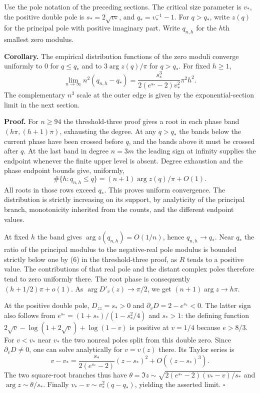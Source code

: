 \documentclass[11pt]{article}
\begin{document}
Use the pole notation of the preceding sections. The critical size parameter is $v_*$, the positive double pole is $s_*=2\sqrt{v_*}$, and $q_*=v_*^{-1}-1$. For $q>q_*$, write $z(q)$ for the principal pole with positive imaginary part. Write $q_{n,h}$ for the $h$th smallest zero modulus.

\textbf{Corollary.} The empirical distribution functions of the zero moduli converge uniformly to $0$ for $q\le q_*$ and to $3\arg z(q)/\pi$ for $q>q_*$. For fixed $h\ge1$,
\[
\lim_{n\to\infty} n^2(q_{n,h}-q_*)
 =\frac{s_*^3}{2(e^{s_*}-2)v_*^2}\pi^2 h^2 .
\]
The complementary $n^3$ scale at the outer edge is given by the exponential-section limit in the next section.

\textbf{Proof.} For $n\ge94$ the threshold-three proof gives a root in each phase band $(h\pi,(h+1)\pi)$, exhausting the degree. At any $q>q_*$ the bands below the current phase have been crossed before $q$, and the bands above it must be crossed after $q$. At the last band in degree $n=3m$ the leading sign at infinity supplies the endpoint whenever the finite upper level is absent. Degree exhaustion and the phase endpoint bounds give, uniformly,
\[
\#\{h:q_{n,h}\le q\}=(n+1)\arg z(q)/\pi+O(1).
\]
All roots in those rows exceed $q_*$. This proves uniform convergence. The distribution is strictly increasing on its support, by analyticity of the principal branch, monotonicity inherited from the counts, and the different endpoint values.

At fixed $h$ the band gives $\arg z(q_{n,h})=O(1/n)$, hence $q_{n,h}\to q_*$. Near $q_*$ the ratio of the principal modulus to the negative-real pole modulus is bounded strictly below one by (6) in the threshold-three proof, as $R$ tends to a positive value. The contributions of that real pole and the distant complex poles therefore tend to zero uniformly there. The root phase is consequently $(h+1/2)\pi+o(1)$. As $\arg D'_v(z)\to\pi/2$, we get $(n+1)\arg z\to h\pi$.

At the positive double pole, $D_{zz}=s_*>0$ and $\partial_v D=2-e^{s_*}<0$. The latter sign also follows from $e^{s_*}=(1+s_*)/(1-s_*^2/4)$ and $s_*>1$: the defining function $2\sqrt v-\log(1+2\sqrt v)+\log(1-v)$ is positive at $v=1/4$ because $e>8/3$. For $v<v_*$ near $v_*$ the two nonreal poles split from this double zero. Since $\partial_vD\ne0$, one can solve analytically for $v=v(z)$ there. Its Taylor series is
\[
v-v_* = \frac{s_*}{2(e^{s_*}-2)}(z-s_*)^2+O((z-s_*)^3).
\]
The two square-root branches thus have $\theta=\Im z\sim\sqrt{2(e^{s_*}-2)(v_*-v)/s_*}$ and $\arg z\sim\theta/s_*$. Finally $v_*-v\sim v_*^2(q-q_*)$, yielding the asserted limit. $\square$
\end{document}
